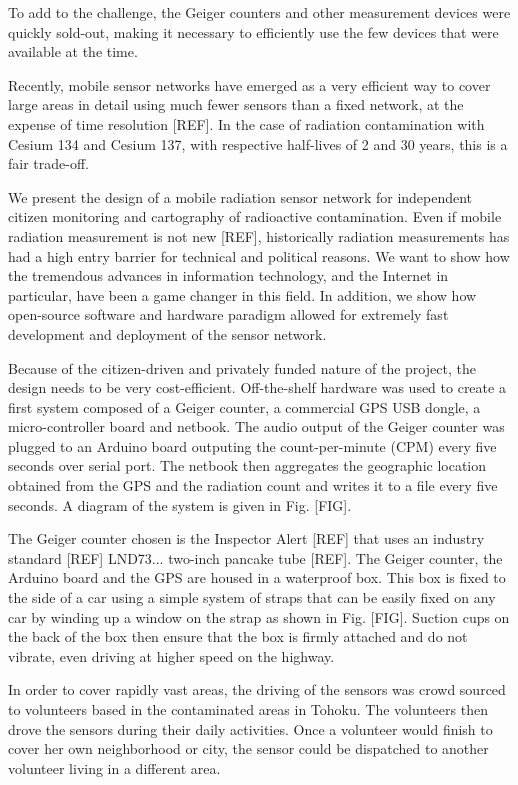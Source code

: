\documentclass[11pt]{article}
\begin{document}
To add to the challenge, the Geiger counters and other measurement devices were quickly sold-out, making it necessary to efficiently use the few devices that
were available at the time.

Recently, mobile sensor networks have emerged as a very efficient way to cover large areas in detail using much fewer sensors than a fixed network, at the expense
of time resolution [REF]. In the case of radiation contamination with Cesium 134 and Cesium 137, with respective half-lives of 2 and 30 years, this is a fair trade-off.

We present the design of a mobile radiation sensor network for independent citizen monitoring and cartography of radioactive contamination.
Even if mobile radiation measurement is not new [REF], historically radiation measurements has had a high entry barrier for technical and political reasons.
We want to show how the tremendous advances in information technology, and the Internet in particular, have been a game changer in this field. In addition, we show how
open-source software and hardware paradigm allowed for extremely fast development and deployment of the sensor network.

Because of the citizen-driven and privately funded nature of the project, the design needs to be very cost-efficient. Off-the-shelf hardware was used to create
a first system composed of a Geiger counter, a commercial GPS USB dongle, a micro-controller board and netbook. The audio output of the Geiger counter
was plugged to an Arduino board outputing the count-per-minute (CPM) every five seconds over serial port. The netbook then aggregates the geographic location
obtained from the GPS and the radiation count and writes it to a file every five seconds. A diagram of the system is given in Fig. [FIG].

The Geiger counter chosen is the Inspector Alert [REF] that uses an industry standard [REF] LND73... two-inch pancake tube [REF].
The Geiger counter, the Arduino board and the GPS are housed in a waterproof box.
This box is fixed to the side of a car using a simple system of straps that can be easily fixed on any car by winding up a window on the strap as shown in Fig. [FIG].
Suction cups on the back of the box then ensure that the box is firmly attached and do not vibrate, even driving at higher speed on the highway.

In order to cover rapidly vast areas, the driving of the sensors was crowd sourced to volunteers based in the contaminated areas in Tohoku.
The volunteers then drove the sensors during their daily activities. Once a volunteer would finish to cover her own neighborhood or city, the sensor
could be dispatched to another volunteer living in a different area.
\end{document}
